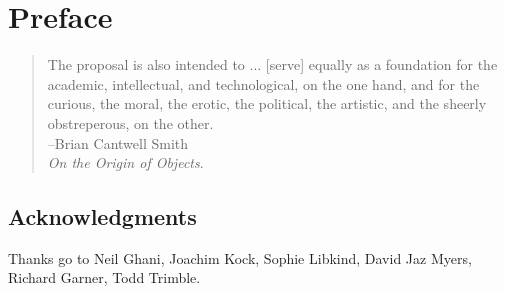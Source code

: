 \documentclass[Book-Poly]{subfiles}
\begin{document}
%


\setcounter{chapter}{-1}%


\chapter*{Preface}\label{chapter.0}

\begin{quote}
	The proposal is also intended to ... [serve] equally as a foundation for the academic, intellectual, and technological, on the one hand, and for the curious, the moral, the erotic, the political, the artistic, and the sheerly obstreperous, on the other.\\
\mbox{}\hfill --Brian Cantwell Smith\\
\mbox{}\hfill \emph{On the Origin of Objects}.
\end{quote}


\section*{Acknowledgments}

Thanks go to Neil Ghani, Joachim Kock, Sophie Libkind, David Jaz Myers, Richard Garner, Todd Trimble.
\end{document}
